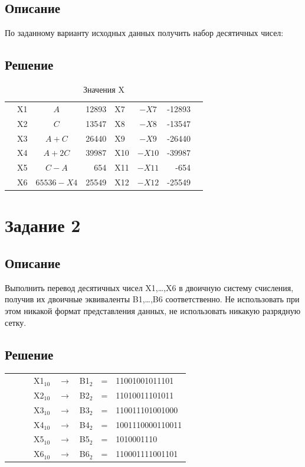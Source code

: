 \documentclass[11pt]{article}
\begin{document}
\subsection{Описание}
\label{sec:org514c6ee}
По заданному варианту исходных данных получить набор десятичных чисел:
\subsection{Решение}
\label{sec:orgb2e538e}
\setlength{\tabcolsep}{3pt}
\begin{table}[htbp]
\caption{\label{tab:org85e00a0}
Значения X}
\centering
\begin{tabular}{|llcr|lcrl|}
\hline
 & X1 & \(A\) & 12893 & X7 & \(-X7\) & -12893 & \\
 & X2 & \(C\) & 13547 & X8 & \(-X8\) & -13547 & \\
 & X3 & \(A+C\) & 26440 & X9 & \(-X9\) & -26440 & \\
 & X4 & \(A+2C\) & 39987 & X10 & \(-X10\) & -39987 & \\
 & X5 & \(C-A\) & 654 & X11 & \(-X11\) & -654 & \\
 & X6 & \(65536-X4\) & 25549 & X12 & \(-X12\) & -25549 & \\
\hline
\end{tabular}
\end{table}

\section{Задание 2}
\label{sec:org27d3fe9}
\subsection{Описание}
\label{sec:org98d07dc}
Выполнить перевод десятичных чисел X1,…,X6 в двоичную систему счисления, получив их двоичные эквиваленты B1,…,B6 соответственно.
Не использовать при этом никакой формат представления данных, не использовать никакую разрядную сетку.

\subsection{Решение}
\label{sec:org7f990ea}
\setlength{\tabcolsep}{3pt}
\label{tab:org201f51e}
\begin{tabular}{llllclcl}
 &  &  & X1\(_{\text{10}}\) & \(\to\) & B1\(_{\text{2}}\) & = & 11001001011101\\
 &  &  & X2\(_{\text{10}}\) & \(\to\) & B2\(_{\text{2}}\) & = & 11010011101011\\
 &  &  & X3\(_{\text{10}}\) & \(\to\) & B3\(_{\text{2}}\) & = & 110011101001000\\
 &  &  & X4\(_{\text{10}}\) & \(\to\) & B4\(_{\text{2}}\) & = & 1001110000110011\\
 &  &  & X5\(_{\text{10}}\) & \(\to\) & B5\(_{\text{2}}\) & = & 1010001110\\
 &  &  & X6\(_{\text{10}}\) & \(\to\) & B6\(_{\text{2}}\) & = & 110001111001101\\
\end{tabular}
\end{document}
